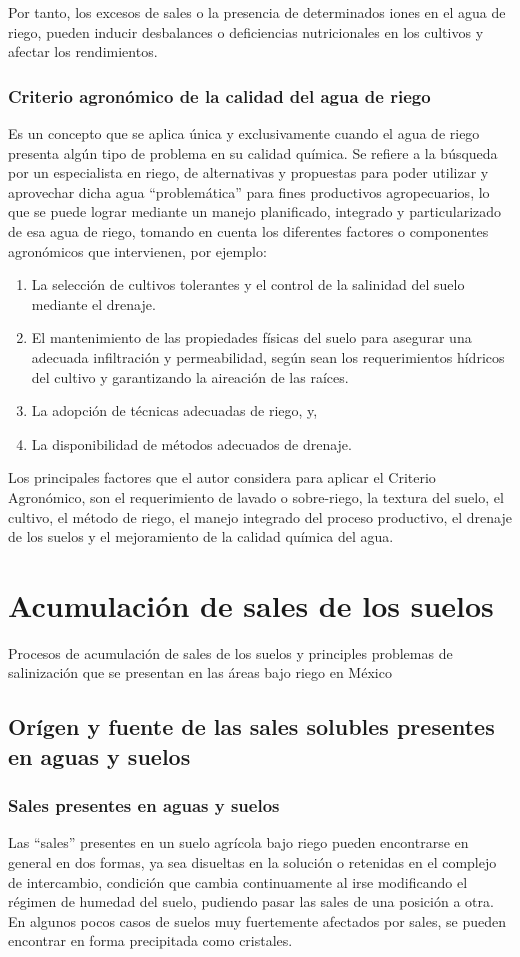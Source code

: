 Por tanto, los excesos de sales o la presencia de determinados iones en el agua de riego, pueden inducir desbalances o deficiencias nutricionales en los cultivos y afectar los rendimientos.

\subsubsection{Criterio agronómico de la calidad del agua de riego}
Es un concepto que se aplica única y exclusivamente cuando el agua de riego
presenta algún tipo de problema en su calidad química.
Se refiere a la búsqueda por un especialista en riego, de alternativas y propuestas
para poder utilizar y aprovechar dicha agua “problemática” para fines productivos
agropecuarios, lo que se puede lograr mediante un manejo planificado, integrado y
particularizado de esa agua de riego, tomando en cuenta los diferentes factores o
componentes agronómicos que intervienen, por ejemplo:
\begin{enumerate}
  \item La selección de cultivos tolerantes y el control de la salinidad del suelo mediante el drenaje.
  \item El mantenimiento de las propiedades físicas del suelo para asegurar una adecuada infiltración y permeabilidad, según sean los requerimientos hídricos del cultivo y garantizando la aireación de las raíces.
  \item La adopción de técnicas adecuadas de riego, y,
  \item La disponibilidad de métodos adecuados de drenaje.
\end{enumerate}
Los principales factores que el autor considera para aplicar el Criterio Agronómico, son el requerimiento de lavado o sobre-riego, la textura del suelo, el cultivo, el método de riego, el manejo integrado del proceso productivo, el drenaje de los suelos y el mejoramiento de la calidad química del agua.
\section{Acumulación de sales de los suelos}
Procesos de acumulación de sales de los suelos y principles problemas de salinización que se presentan en las áreas bajo riego en México
\subsection{Orígen y fuente de las sales solubles presentes en aguas y suelos}
\subsubsection{Sales presentes en aguas y suelos}
Las ``sales'' presentes en un suelo agrícola bajo riego pueden encontrarse en general en dos formas, ya sea disueltas en la solución o retenidas en el complejo de intercambio, condición que cambia continuamente al irse modificando el régimen de humedad del suelo, pudiendo pasar las sales de una posición a otra. En algunos pocos casos de suelos muy fuertemente afectados por sales, se pueden encontrar en forma precipitada como cristales.

